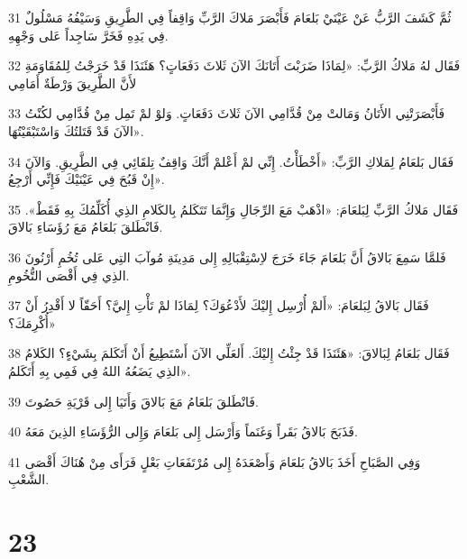 \par 31 ثُمَّ كَشَفَ الرَّبُّ عَنْ عَيْنَيْ بَلعَامَ فَأَبْصَرَ مَلاكَ الرَّبِّ وَاقِفاً فِي الطَّرِيقِ وَسَيْفُهُ مَسْلُولٌ فِي يَدِهِ فَخَرَّ سَاجِداً عَلى وَجْهِهِ.
\par 32 فَقَال لهُ مَلاكُ الرَّبِّ: «لِمَاذَا ضَرَبْتَ أَتَانَكَ الآنَ ثَلاثَ دَفَعَاتٍ؟ هَئَنَذَا قَدْ خَرَجْتُ لِلمُقَاوَمَةِ لأَنَّ الطَّرِيقَ وَرْطَةٌ أَمَامِي
\par 33 فَأَبْصَرَتْنِي الأَتَانُ وَمَالتْ مِنْ قُدَّامِي الآنَ ثَلاثَ دَفَعَاتٍ. وَلوْ لمْ تَمِل مِنْ قُدَّامِي لكُنْتُ الآنَ قَدْ قَتَلتُكَ وَاسْتَبْقَيْتُهَا».
\par 34 فَقَال بَلعَامُ لِمَلاكِ الرَّبِّ: «أَخْطَأْتُ. إِنِّي لمْ أَعْلمْ أَنَّكَ وَاقِفٌ تِلقَائِي فِي الطَّرِيقِ. وَالآنَ إِنْ قَبُحَ فِي عَيْنَيْكَ فَإِنِّي أَرْجِعُ».
\par 35 فَقَال مَلاكُ الرَّبِّ لِبَلعَامَ: «اذْهَبْ مَعَ الرِّجَالِ وَإِنَّمَا تَتَكَلمُ بِالكَلامِ الذِي أُكَلِّمُكَ بِهِ فَقَطْ». فَانْطَلقَ بَلعَامُ مَعَ رُؤَسَاءِ بَالاقَ.
\par 36 فَلمَّا سَمِعَ بَالاقُ أَنَّ بَلعَامَ جَاءَ خَرَجَ لاِسْتِقْبَالِهِ إِلى مَدِينَةِ مُوآبَ التِي عَلى تُخُمِ أَرْنُونَ الذِي فِي أَقْصَى التُّخُومِ.
\par 37 فَقَال بَالاقُ لِبَلعَامَ: «أَلمْ أُرْسِل إِليْكَ لأَدْعُوَكَ؟ لِمَاذَا لمْ تَأْتِ إِليَّ؟ أَحَقّاً لا أَقْدِرُ أَنْ أُكْرِمَكَ؟»
\par 38 فَقَال بَلعَامُ لِبَالاقَ: «هَئَنَذَا قَدْ جِئْتُ إِليْكَ. أَلعَلِّي الآنَ أَسْتَطِيعُ أَنْ أَتَكَلمَ بِشَيْءٍ؟ الكَلامُ الذِي يَضَعُهُ اللهُ فِي فَمِي بِهِ أَتَكَلمُ».
\par 39 فَانْطَلقَ بَلعَامُ مَعَ بَالاقَ وَأَتَيَا إِلى قَرْيَةِ حَصُوتَ.
\par 40 فَذَبَحَ بَالاقُ بَقَراً وَغَنَماً وَأَرْسَل إِلى بَلعَامَ وَإِلى الرُّؤَسَاءِ الذِينَ مَعَهُ.
\par 41 وَفِي الصَّبَاحِ أَخَذَ بَالاقُ بَلعَامَ وَأَصْعَدَهُ إِلى مُرْتَفَعَاتِ بَعْلٍ فَرَأَى مِنْ هُنَاكَ أَقْصَى الشَّعْبِ.

\chapter{23}

